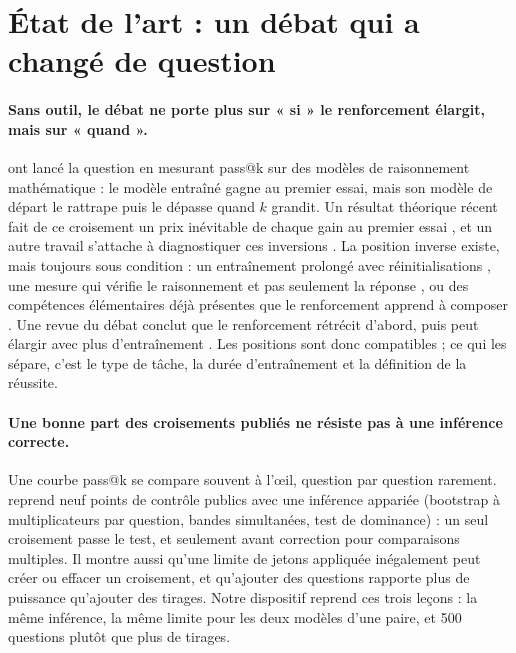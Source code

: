\documentclass[11pt,a4paper]{article}
\begin{document}
\section{État de l'art : un débat qui a changé de question}

\paragraph{Sans outil, le débat ne porte plus sur « si » le renforcement élargit, mais sur « quand ».} \citet{yue2025does} ont lancé la question en mesurant pass@k sur des modèles de raisonnement mathématique : le modèle entraîné gagne au premier essai, mais son modèle de départ le rattrape puis le dépasse quand $k$ grandit. Un résultat théorique récent fait de ce croisement un prix inévitable de chaque gain au premier essai \citep{liu2026nofreelunch}, et un autre travail s'attache à diagnostiquer ces inversions \citep{zhou2026shrinks}. La position inverse existe, mais toujours sous condition : un entraînement prolongé avec réinitialisations \citep{liu2025prorl}, une mesure qui vérifie le raisonnement et pas seulement la réponse \citep{wen2025implicitly}, ou des compétences élémentaires déjà présentes que le renforcement apprend à composer \citep{cheng2025atomic}. Une revue du débat conclut que le renforcement rétrécit d'abord, puis peut élargir avec plus d'entraînement \citep{yao2025debate}. Les positions sont donc compatibles ; ce qui les sépare, c'est le type de tâche, la durée d'entraînement et la définition de la réussite.

\paragraph{Une bonne part des croisements publiés ne résiste pas à une inférence correcte.} Une courbe pass@k se compare souvent à l'œil, question par question rarement. \citet{yang2026crossovers} reprend neuf points de contrôle publics avec une inférence appariée (bootstrap à multiplicateurs par question, bandes simultanées, test de dominance) : un seul croisement passe le test, et seulement avant correction pour comparaisons multiples. Il montre aussi qu'une limite de jetons appliquée inégalement peut créer ou effacer un croisement, et qu'ajouter des questions rapporte plus de puissance qu'ajouter des tirages. Notre dispositif reprend ces trois leçons : la même inférence, la même limite pour les deux modèles d'une paire, et 500 questions plutôt que plus de tirages.
\end{document}
